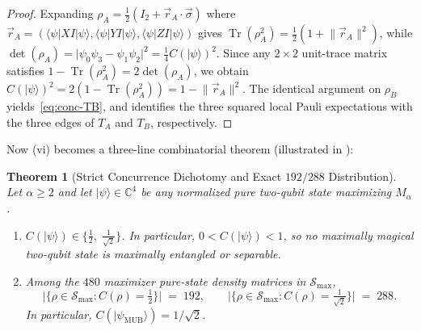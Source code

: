 \documentclass[11pt,a4paper]{article}
\theoremstyle{plain}
\newtheorem{theorem}{Theorem}[section]
\theoremstyle{definition}
\theoremstyle{remark}
\newcommand{\C}{\mathbb{C}}
\newcommand{\ket}[1]{\lvert #1 \rangle}
\newcommand{\expval}[2]{\langle #1 \vert #2 \vert #1 \rangle}
\newcommand{\Tr}{\operatorname{Tr}}
\newcommand{\psimub}{\ket{\psi_{\mathrm{MUB}}}}
\begin{document}
\begin{proof}
Expanding $\rho_A = \frac{1}{2}(I_2 + \vec{r}_A \cdot \vec{\sigma})$ where $\vec{r}_A = (\expval{\psi}{XI}, \expval{\psi}{YI}, \expval{\psi}{ZI})$ gives $\Tr(\rho_A^2) = \frac{1}{2}(1 + \lVert\vec{r}_A\rVert^2)$, while $\det(\rho_A) = \lvert\psi_0\psi_3 - \psi_1\psi_2\rvert^2 = \frac{1}{4}C(\ket{\psi})^2$. Since any $2\times 2$ unit-trace matrix satisfies $1 - \Tr(\rho_A^2) = 2\det(\rho_A)$, we obtain $C(\ket{\psi})^2 = 2(1 - \Tr(\rho_A^2)) = 1 - \lVert\vec{r}_A\rVert^2$. The identical argument on $\rho_B$ yields~\eqref{eq:conc-TB}, and  identifies the three squared local Pauli expectations with the three edges of $T_A$ and $T_B$, respectively.
\end{proof}

Now (vi) becomes a three-line combinatorial theorem (illustrated in ):

\begin{theorem}[Strict Concurrence Dichotomy and Exact $192/288$ Distribution]
\label{thm:concurrence}
Let $\alpha \ge 2$ and let $\ket{\psi} \in \C^4$ be any normalized pure two-qubit state maximizing $M_\alpha$.
\begin{enumerate}[label=\textup{(\alph*)}, leftmargin=2em]
  \item $C(\ket{\psi}) \in \bigl\{\frac{1}{2},\; \frac{1}{\sqrt{2}}\bigr\}$. In particular, $0 < C(\ket{\psi}) < 1$, so no maximally magical two-qubit state is maximally entangled or separable.
  \item Among the $480$ maximizer pure-state density matrices in $\mathcal{S}_{\max}$,
  \begin{equation}
    \bigl\lvert\{\rho \in \mathcal{S}_{\max} : C(\rho) = \tfrac{1}{2}\}\bigr\rvert \;=\; 192,
    \qquad
    \bigl\lvert\{\rho \in \mathcal{S}_{\max} : C(\rho) = \tfrac{1}{\sqrt{2}}\}\bigr\rvert \;=\; 288.
  \end{equation}
  In particular, $C(\psimub) = 1/\sqrt{2}$.
\end{enumerate}
\end{theorem}
\end{document}
